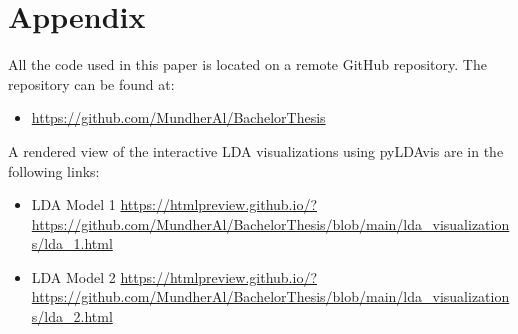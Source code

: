 \section*{Appendix}

All the code used in this paper is located on a remote GitHub repository. The repository can be found at:


\begin{itemize}
    \item \url{https://github.com/MundherAl/BachelorThesis}
\end{itemize}

A rendered view of the interactive LDA visualizations using pyLDAvis are in the following links:

\begin{itemize}
    \item LDA Model 1 \url{https://htmlpreview.github.io/?https://github.com/MundherAl/BachelorThesis/blob/main/lda_visualizations/lda_1.html}
    \item LDA Model 2 \url{https://htmlpreview.github.io/?https://github.com/MundherAl/BachelorThesis/blob/main/lda_visualizations/lda_2.html}
\end{itemize}

